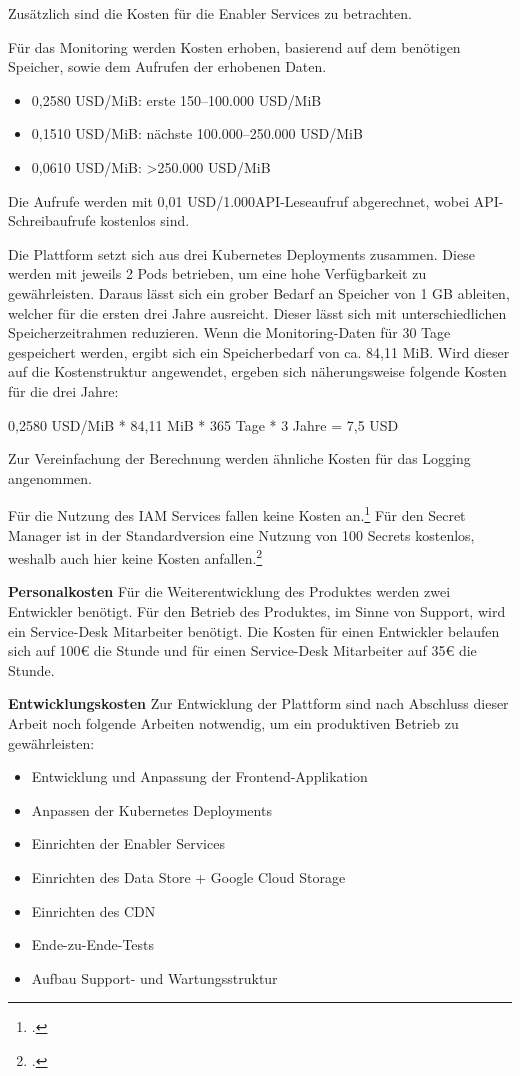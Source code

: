 Zusätzlich sind die Kosten für die Enabler Services zu betrachten.

Für das Monitoring werden Kosten erhoben, basierend auf dem benötigen Speicher, sowie dem Aufrufen der erhobenen Daten.

\begin{itemize}
    \item 0,2580 \ac{USD}/MiB: erste 150–100.000 \ac{USD}/MiB
    \item 0,1510 \ac{USD}/MiB: nächste 100.000–250.000 \ac{USD}/MiB
    \item 0,0610 \ac{USD}/MiB: >250.000 \ac{USD}/MiB
\end{itemize}

Die Aufrufe werden mit 0,01 \ac{USD}/1.000API-Leseaufruf abgerechnet, wobei API-Schreibaufrufe kostenlos sind.

Die Plattform setzt sich aus drei Kubernetes Deployments zusammen.
Diese werden mit jeweils 2 Pods betrieben, um eine hohe Verfügbarkeit zu gewährleisten.
Daraus lässt sich ein grober Bedarf an Speicher von 1 GB ableiten, welcher für die ersten drei Jahre ausreicht.
Dieser lässt sich mit unterschiedlichen Speicherzeitrahmen reduzieren.
Wenn die Monitoring-Daten für 30 Tage gespeichert werden, ergibt sich ein Speicherbedarf von ca. 84,11 MiB.
Wird dieser auf die Kostenstruktur angewendet, ergeben sich näherungsweise folgende Kosten für die drei Jahre:

0,2580 \ac{USD}/MiB * 84,11 MiB * 365 Tage * 3 Jahre = 7,5 \ac{USD}

Zur Vereinfachung der Berechnung werden ähnliche Kosten für das Logging angenommen.

Für die Nutzung des \ac{IAM} Services fallen keine Kosten an.\footcite{GoogleIAMPricing2025}
Für den Secret Manager ist in der Standardversion eine Nutzung von 100 Secrets kostenlos, weshalb auch hier keine Kosten anfallen.\footcite{GoogleSecretManagerPricing2025}

\textbf{Personalkosten}\newline
Für die Weiterentwicklung des Produktes werden zwei Entwickler benötigt.
Für den Betrieb des Produktes, im Sinne von Support, wird ein Service-Desk Mitarbeiter benötigt.
Die Kosten für einen Entwickler belaufen sich auf 100€ die Stunde und für einen Service-Desk Mitarbeiter auf 35€ die Stunde.


\textbf{Entwicklungskosten}\newline
Zur Entwicklung der Plattform sind nach Abschluss dieser Arbeit noch folgende Arbeiten notwendig, um ein produktiven Betrieb zu gewährleisten:
\begin{itemize}
    \item Entwicklung und Anpassung der Frontend-Applikation
    \item Anpassen der Kubernetes Deployments
    \item Einrichten der Enabler Services
    \item Einrichten des Data Store + Google Cloud Storage
    \item Einrichten des \ac{CDN}
    \item Ende-zu-Ende-Tests
    \item Aufbau Support- und Wartungsstruktur
\end{itemize}

